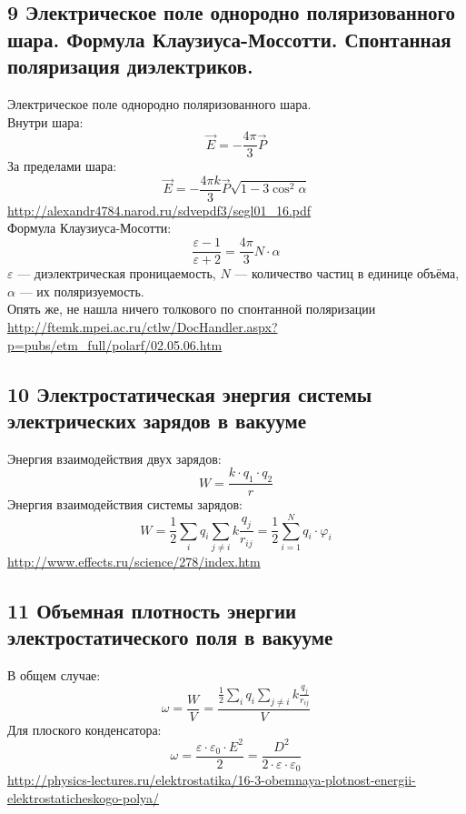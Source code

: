 \documentclass[a4paper,12pt]{article}
\begin{document}
\subsection{9   Электрическое поле однородно поляризованного шара. Формула Клаузиуса-Моссотти. Спонтанная поляризация диэлектриков.}
Электрическое поле однородно поляризованного шара. \\
Внутри шара: \\
\begin{equation}
        \vec{E} = - \frac{4 \pi}{3} \vec{P}
\end{equation}
За пределами шара:
\begin{equation}
        \vec{E} = - \frac{4 \pi k}{3} \vec{P} \sqrt{1 - 3 \cos^2 {\alpha}}
\end{equation}
\url{http://alexandr4784.narod.ru/sdvepdf3/segl01_16.pdf} \\
Формула Клаузиуса-Мосотти:\\
\begin{equation}
	\frac{\varepsilon - 1}{\varepsilon + 2} = \frac{4 \pi}{3} N \cdot \alpha
\end{equation}
$\varepsilon$ — диэлектрическая проницаемость, $N$ — количество частиц в единице объёма, $\alpha$ — их поляризуемость.\\
Опять же, не нашла ничего толкового по спонтанной поляризации\\
\url{http://ftemk.mpei.ac.ru/ctlw/DocHandler.aspx?p=pubs/etm_full/polarf/02.05.06.htm}

\subsection{10   Электростатическая энергия системы электрических зарядов в вакууме}
Энергия взаимодействия двух зарядов:\\
\begin{equation}
	W = \frac{k \cdot q_1 \cdot q_2}{r}
\end{equation}
Энергия взаимодействия системы зарядов:\\
\begin{equation}
	W = \frac{1}{2} \sum _i q_i \sum _{j \neq i} k \frac{q_j}{r_{ij}} = \frac{1}{2} \sum _{i = 1} ^N q_i \cdot \varphi _i
\end{equation}
\url{http://www.effects.ru/science/278/index.htm}

\subsection{11	Объемная плотность энергии электростатического поля в вакууме}
В общем случае:
\begin{equation}
	\omega = \frac {W}{V} = \frac {\frac{1}{2} \sum _i q_i \sum _{j \neq i} k \frac{q_j}{r_{ij}}} {V}	
\end{equation}
Для плоского конденсатора:
\begin{equation}
	\omega = \frac{\varepsilon \cdot \varepsilon _0 \cdot E^2}{2} = \frac{D^2}{2 \cdot \varepsilon \cdot \varepsilon _0}
\end{equation}
\url{http://physics-lectures.ru/elektrostatika/16-3-obemnaya-plotnost-energii-elektrostaticheskogo-polya/}
\end{document}
